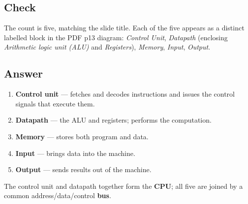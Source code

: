 \subsection*{Check}

The count is five, matching the slide title. Each of the five appears as a
distinct labelled block in the PDF p13 diagram: \emph{Control Unit},
\emph{Datapath} (enclosing \emph{Arithmetic logic unit (ALU)} and
\emph{Registers}), \emph{Memory}, \emph{Input}, \emph{Output}.

\subsection*{Answer}

\begin{answerbox}
\begin{enumerate}[nosep]
  \item \textbf{Control unit} — fetches and decodes instructions and issues the
    control signals that execute them.
  \item \textbf{Datapath} — the ALU and registers; performs the computation.
  \item \textbf{Memory} — stores both program and data.
  \item \textbf{Input} — brings data into the machine.
  \item \textbf{Output} — sends results out of the machine.
\end{enumerate}
\vspace{2pt}
The control unit and datapath together form the \textbf{CPU}; all five are
joined by a common address/data/control \textbf{bus}.
\end{answerbox}


